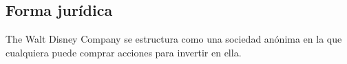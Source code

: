 \subsection{Forma jurídica}
The Walt Disney Company se estructura como una sociedad anónima en la que cualquiera puede comprar acciones para invertir en ella.
